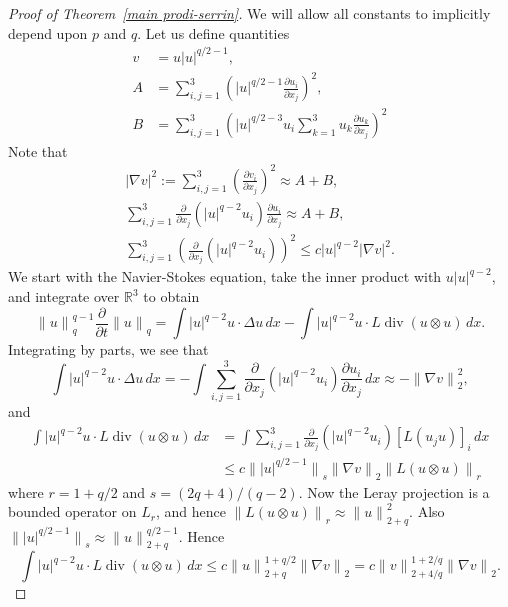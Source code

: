 \documentclass[12pt]{amsart}
\theoremstyle{remark}
\newcommand{\R}{{\mathbb R}}
\newcommand{\smodo}[1]{{\mathopen|#1\mathclose|}}
\newcommand{\snormo}[1]{{\mathopen\|#1\mathclose\|}}
\DeclareMathOperator{\divergence}{div}
\begin{document}
\begin{proof}[Proof of Theorem~\ref{main prodi-serrin}]
We will allow all constants to implicitly
depend upon $p$ and $q$.
Let us define quantities
\begin{align*}
v &= u \smodo u^{q/2-1} ,\\
A &= \sum_{i,j=1}^3 \left(\smodo u^{q/2-1} 
     \frac{\partial u_i}{\partial x_j} \right)^2 ,\\
B &= \sum_{i,j=1}^3 \left(\smodo u^{q/2-3} u_i \sum_{k=1}^3 u_k 
     \frac{\partial u_k}{\partial x_j}\right)^2
\end{align*}
Note that
\begin{gather*}
   \smodo{\nabla v}^2 := \sum_{i,j=1}^3 \left(
   \frac{\partial v_i}{\partial x_j}\right)^2
   \approx A + B,\\
   \sum_{i,j=1}^3 \frac\partial{\partial x_j}\left( \smodo u^{q-2} u_i \right)
   \frac{\partial u_i}{\partial x_j}
   \approx A + B,\\
   \sum_{i,j=1}^3 \left(\frac\partial{\partial x_j} 
   \left(\smodo u^{q-2} u_i\right)\right)^2
   \le
   c \smodo u^{q-2} \smodo{\nabla v}^2 .
\end{gather*}
We start with the Navier-Stokes equation, take the inner product with 
$u \smodo{u}^{q-2}$, and integrate over $\R^3$ to obtain
$$
    \snormo u_q^{q-1} \frac{\partial}{\partial t} \snormo u_q
    =
    \int \smodo u^{q-2} u \cdot \Delta u \, dx
    -
    \int \smodo u^{q-2} u \cdot L \divergence (u \otimes u) \, dx .
$$
Integrating by parts, we see that
$$ \int \smodo u^{q-2} u \cdot \Delta u \, dx
   =
   - \int 
   \sum_{i,j=1}^3 \frac\partial{\partial x_j}\left( \smodo u^{q-2} u_i \right)
   \frac{\partial u_i}{\partial x_j}
   \, dx
   \approx
   - \snormo{\nabla v}_2^2 ,$$
and
\begin{align*} 
   \int \smodo u^{q-2} u \cdot L \divergence (u \otimes u) \, dx
   &=
   \int \sum_{i,j=1}^3
        \frac\partial{\partial x_j} \left(\smodo u^{q-2} u_i\right)
        [L (u_j u)]_i \, dx \\
   &\le
   c \snormo{\smodo{u}^{q/2-1}}_s \snormo{\nabla v}_2 \snormo{L(u \otimes u)}_r
\end{align*}
where $r = 1+q/2$ and $s = (2q+4)/(q-2)$.  Now the Leray projection is a bounded
operator on $L_r$, and hence 
$\snormo{L(u \otimes u)}_r \approx \snormo u_{2+q}^2$.  Also
$\snormo{\smodo{u}^{q/2-1}}_s \approx \snormo u_{2+q}^{q/2-1}$.  Hence
$$ \int \smodo u^{q-2} u \cdot L \divergence (u \otimes u) \, dx
   \le c \snormo u_{2+q}^{1+q/2} \snormo{\nabla v}_2 
   = c \snormo v_{2+4/q}^{1+2/q} \snormo{\nabla v}_2 .$$

\end{proof}
\end{document}
